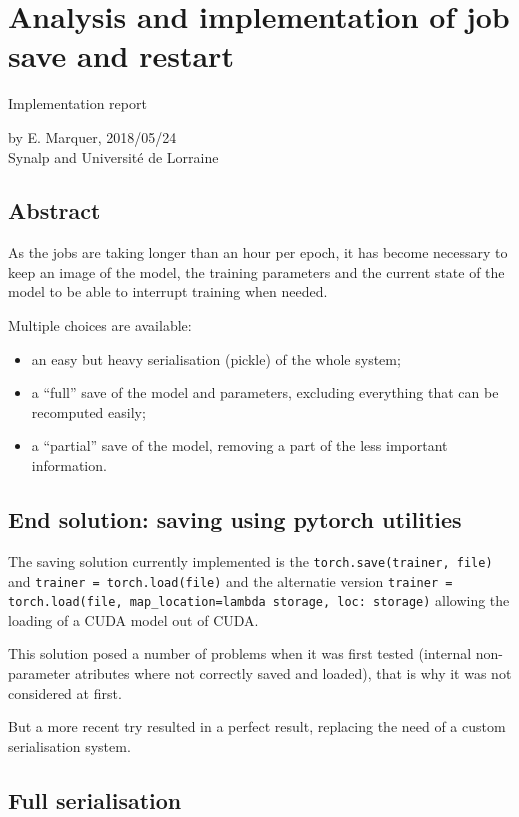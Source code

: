 \section*{Analysis and implementation of job save and
restart}

Implementation report

by E. Marquer, 2018/05/24\\
Synalp and Université de Lorraine

\subsection{Abstract}

As the jobs are taking longer than an hour per epoch, it has become
necessary to keep an image of the model, the training parameters and the
current state of the model to be able to interrupt training when needed.

Multiple choices are available:
\begin{itemize}
\item an easy but heavy serialisation (pickle) of the whole system;
\item a ``full'' save of the model and parameters, excluding everything that can be recomputed easily;
\item a ``partial'' save of the model, removing a part of the less important
information.
\end{itemize}

\subsection{\texorpdfstring{\textbf{End solution: saving using pytorch
utilities}}{End solution: saving using pytorch utilities}}

The saving solution currently implemented is the
\lstinline!torch.save(trainer, file)! and
\lstinline!trainer = torch.load(file)! and the alternatie version
\lstinline!trainer = torch.load(file, map_location=lambda storage, loc: storage)!
allowing the loading of a CUDA model out of CUDA.

This solution posed a number of problems when it was first tested
(internal non-parameter atributes where not correctly saved and loaded),
that is why it was not considered at first.

But a more recent try resulted in a perfect result, replacing the need
of a custom serialisation system.

\subsection{Full serialisation}

